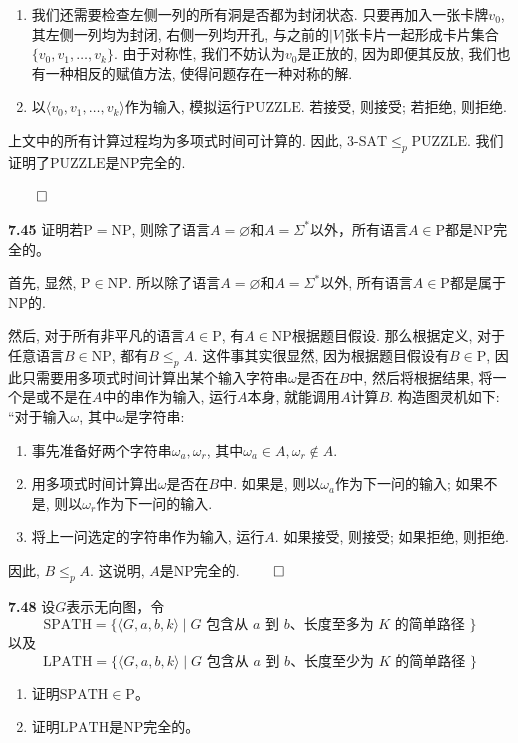 \documentclass[UTF8]{report}
\renewcommand{\P}{\mathbb{P}} %
\newcommand{\problem}[1]{{\setlength{\parskip}{10pt}\noindent \bf{#1}}}
\renewenvironment{proof}{{\setlength{\parskip}{7pt}\noindent\hskip 2em \bf 证明 \quad}}{\hfill$\qed$\par}
\newcommand{\NP}{\mathrm{NP}}
\newcommand{\threeSAT}{\mathrm{3\text{-}SAT}}
\renewcommand{\P}{\mathrm{P}}
\newcommand{\PUZZLE}{\mathrm{PUZZLE}}
\newcommand{\SPATH}{\mathrm{SPATH}}
\newcommand{\LPATH}{\mathrm{LPATH}}
\begin{document}
\begin{proof}
\begin{enumerate}
\begin{enumerate}
            \item 我们还需要检查左侧一列的所有洞是否都为封闭状态. 只要再加入一张卡牌$v_0$, 其左侧一列均为封闭, 右侧一列均开孔, 与之前的$|V|$张卡片一起形成卡片集合$\{v_0, v_1, \dots, v_k\}$. 由于对称性, 我们不妨认为$v_0$是正放的, 因为即便其反放, 我们也有一种相反的赋值方法, 使得问题存在一种对称的解. 
            \item 以$\langle v_0, v_1, \dots, v_k\rangle$作为输入, 模拟运行$\PUZZLE$. 若接受, 则接受; 若拒绝, 则拒绝.
        \end{enumerate}

        上文中的所有计算过程均为多项式时间可计算的. 因此, $\threeSAT \leq_p \PUZZLE$. 我们证明了$\PUZZLE$是$\NP$完全的.
    \end{enumerate}
\end{proof}





\problem{7.45} 证明若$\P = \NP$, 则除了语言$A = \varnothing$和$A = \Sigma^*$以外，所有语言$A \in \P$都是$\NP$完全的。

\begin{proof}
    首先, 显然, $\P \in \NP$. 所以除了语言$A = \varnothing$和$A = \Sigma^*$以外, 所有语言$A \in \P$都是属于$\NP$的.

    然后, 对于所有非平凡的语言$A \in \P$, 有$A \in \NP$根据题目假设. 那么根据定义, 对于任意语言$B \in \NP$, 都有$B \leq_p A$. 这件事其实很显然, 因为根据题目假设有$B \in \P$, 因此只需要用多项式时间计算出某个输入字符串$\omega$是否在$B$中, 然后将根据结果, 将一个是或不是在$A$中的串作为输入, 运行$A$本身, 就能调用$A$计算$B$. 构造图灵机如下:
    ``对于输入$\omega$, 其中$\omega$是字符串:
    \begin{enumerate}
        \item 事先准备好两个字符串$\omega_a, \omega_r$, 其中$\omega_a \in A, \omega_r \notin A$.
        \item 用多项式时间计算出$\omega$是否在$B$中. 如果是, 则以$\omega_a$作为下一问的输入; 如果不是, 则以$\omega_r$作为下一问的输入.
        \item 将上一问选定的字符串作为输入, 运行$A$. 如果接受, 则接受; 如果拒绝, 则拒绝.
    \end{enumerate}

    因此, $B \leq_p A$. 这说明, $A$是$\NP$完全的.
\end{proof}


\problem{7.48} 设$G $表示无向图，令
\[
    \SPATH = \{ \langle G,a,b,k \rangle \mid G \text{ 包含从 }a \text{ 到 }b \text{、长度至多为 }K \text{ 的简单路径 }\}
\]
以及
\[
    \LPATH = \{ \langle G,a,b,k \rangle \mid G \text{ 包含从 }a \text{ 到 }b \text{、长度至少为 }K \text{ 的简单路径 }\}
\]
\begin{enumerate}[label=\alph*.]
    \item 证明$\SPATH \in \P$。
    \item 证明$\LPATH$是$\NP$完全的。
\end{enumerate}
\end{document}
